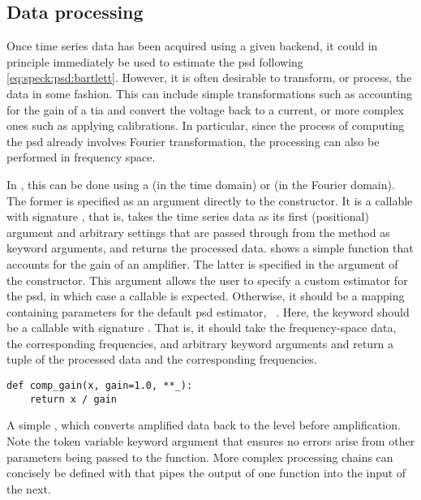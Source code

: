 \subsection{Data processing}\label{subsec:speck:software:design:processing}
Once time series data has been acquired using a given  backend, it could in principle immediately be used to estimate the \gls{psd} following \cref{eq:speck:psd:bartlett}.
However, it is often desirable to transform, or process, the data in some fashion.
This can include simple transformations such as accounting for the gain of a \gls{tia} and convert the voltage back to a current,
or more complex ones such as applying calibrations.
In particular, since the process of computing the \gls{psd} already involves Fourier transformation, the processing can also be performed in frequency space.

In \pyspeck, this can be done using a  (in the time domain) or  (in the Fourier domain).
The former is specified as an argument directly to the  constructor.
It is a callable with signature , that is, takes the time series data as its first (positional) argument and arbitrary settings that are passed through from the  method as keyword arguments, and returns the processed data.
 shows a simple function that accounts for the gain of an amplifier.
The latter is specified in the  argument of the  constructor.
This argument allows the user to specify a custom estimator for the \gls{psd}, in which case a callable is expected.
Otherwise, it should be a mapping containing parameters for the default \gls{psd} estimator, ~.
Here, the keyword  should be a callable with signature .
That is, it should take the frequency-space data, the corresponding frequencies, and arbitrary keyword arguments and return a tuple of the processed data and the corresponding frequencies.

\begin{marginlisting}
    \begin{verbatim}
def comp_gain(x, gain=1.0, **_):
    return x / gain
    \end{verbatim}
    \caption[Simple  example]{
        A simple , which converts amplified data back to the level before amplification.
        Note the token \code{**_} variable keyword argument that ensures no errors arise from other parameters being passed to the function.
        More complex processing chains can concisely be defined with  that pipes the output of one function into the input of the next.
    }
    \label{lst:speck:procfn}
\end{marginlisting}

